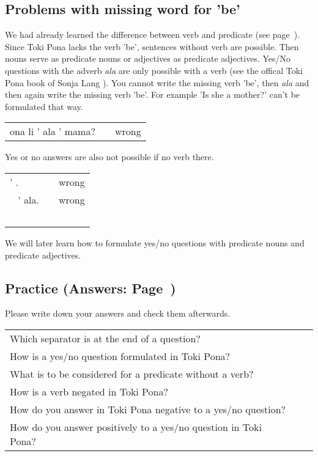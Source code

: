 % 
\subsection*{Problems with missing word for 'be'}

We had already learned the difference between verb and predicate (see page~\pageref{'predicate'}). 
Since Toki Pona lacks the verb 'be', sentences without verb are possible. 
Then nouns serve as predicate nouns or adjectives as predicate adjectives. 
Yes/No questions with the adverb \textit{ala} are only possible with a verb (see the offical Toki Pona book of Sonja Lang \cite{www:tokipona.org}). 
You cannot write the missing verb 'be', then \textit{ala} and then again write the missing verb 'be'.
For example 'Is she a mother?' can't be formulated that way. 

\begin{supertabular}{p{5,5cm}|ll}
ona li ' ala ' mama? && wrong \\ %
\end{supertabular} 

Yes or no answers are also not possible if no verb there. 

\begin{supertabular}{p{5,5cm}|ll}
' . && wrong \\\ %
' ala. && wrong \\\ %
\end{supertabular} 

We will later learn how to formulate yes/no questions with predicate nouns and predicate adjectives.
%
\newpage
%
\subsection*{Practice (Answers: Page~\pageref{'negation_yes_no_questions'})}
%
Please write down your answers and check them afterwards. 

\begin{supertabular}{p{5,5cm}|ll}
Which separator is at the end of a question? &&  \\ %
How is a yes/no question formulated in Toki Pona? &&   \\ %
What is to be considered for a predicate without a verb? &&   \\ %
How is a verb negated in Toki Pona? &&  \\ %
How do you answer in Toki Pona negative to a yes/no question? &&  \\ %
How do you answer positively to a yes/no question in Toki Pona? &&  \\ %
\end{supertabular} 

